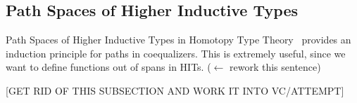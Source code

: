 \subsection{Path Spaces of Higher Inductive Types}
Path Spaces of Higher Inductive Types in Homotopy Type
Theory~\cite{kraus2019path} provides an induction principle for paths in
coequalizers. This is extremely useful, since we want to define functions out of
spans in HITs. ($\leftarrow$ rework this sentence)

[GET RID OF THIS SUBSECTION AND WORK IT INTO VC/ATTEMPT]